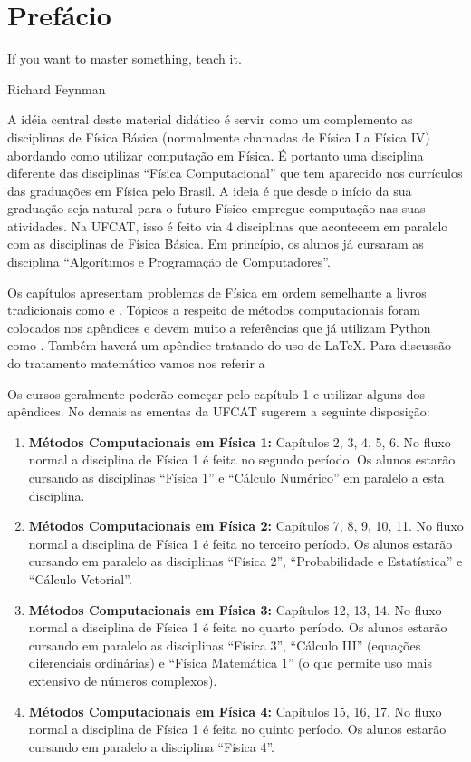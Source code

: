 	\chapter{Prefácio}
\epigraph{If you want to master something, teach it.}{Richard Feynman}
	
	A idéia central deste material didático é servir como um complemento as disciplinas de Física Básica (normalmente chamadas de Física I a Física IV) abordando como utilizar computação em Física. É portanto uma disciplina diferente das disciplinas ``Física Computacional'' que tem aparecido nos currículos das graduações em Física pelo Brasil. A ideia é que desde o início da sua graduação seja natural para o futuro Físico empregue computação nas suas atividades. Na UFCAT, isso é feito via 4 disciplinas que acontecem em paralelo com as disciplinas de Física Básica. Em princípio, os alunos já cursaram as disciplina ``Algorítimos e Programação de Computadores''.
	
	Os capítulos apresentam problemas de Física em ordem semelhante a livros tradicionais como \cite{halliday2002fundamentals} e \cite{nussenzveig2013curso, nussenzveig2014curso, nussenzveig2015curso, nussenzveig2018curso}. Tópicos a respeito de métodos computacionais foram colocados nos apêndices e devem muito a referências que já utilizam Python como \cite{ayars2013computational, hill2020learning}. Também haverá um apêndice tratando do uso de \LaTeX. Para discussão do tratamento matemático vamos nos referir a \cite{anjos2017metodos}
	
	Os cursos geralmente poderão começar pelo capítulo 1 e utilizar alguns dos apêndices. No demais as ementas da UFCAT sugerem a seguinte disposição:
	\begin{enumerate}
	    \item  {\bf Métodos Computacionais em Física 1:}  Capítulos 2, 3, 4, 5, 6. 
	    No fluxo normal a disciplina de Física 1 é feita no segundo período. Os alunos estarão cursando as disciplinas ``Física 1'' e ``Cálculo Numérico'' em paralelo a esta disciplina.
	    \item {\bf Métodos Computacionais em Física 2:} Capítulos 7, 8, 9, 10, 11. No fluxo normal a disciplina de Física 1 é feita no terceiro período. Os alunos estarão cursando em paralelo as disciplinas ``Física 2'', ``Probabilidade e Estatística'' e ``Cálculo Vetorial''.
	    \item {\bf Métodos Computacionais em Física 3:} Capítulos 12, 13, 14. No fluxo normal a disciplina de Física 1 é feita no quarto período. Os alunos estarão cursando em paralelo as disciplinas ``Física 3'', ``Cálculo III'' (equações diferenciais ordinárias) e ``Física Matemática 1'' (o que permite uso mais extensivo de números complexos).
	    \item {\bf Métodos Computacionais em Física 4:} Capítulos 15, 16, 17. No fluxo normal a disciplina de Física 1 é feita no quinto período. Os alunos estarão cursando em paralelo a disciplina ``Física 4''.
	\end{enumerate}
	
